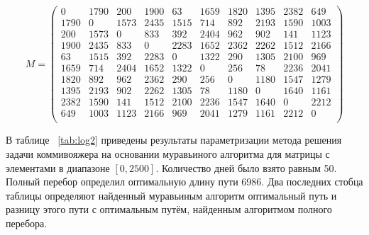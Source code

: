 \begin{equation}
    \label{matrix1}
    M = \begin{pmatrix}
        0 &  1790 &   200 &  1900 &    63 &  1659 &  1820 &  1395 &  2382 &   649 \\
        1790 &     0 &  1573 &  2435 &  1515 &   714 &   892 &  2193 &  1590 &  1003 \\
        200 &  1573 &     0 &   833 &   392 &  2404 &   962 &   902 &   141 &  1123 \\
        1900 &  2435 &   833 &     0 &  2283 &  1652 &  2362 &  2262 &  1512 &  2166 \\
        63 &  1515 &   392 &  2283 &     0 &  1322 &   290 &  1305 &  2100 &   969 \\
        1659 &   714 &  2404 &  1652 &  1322 &     0 &   256 &    78 &  2236 &  2041 \\
        1820 &   892 &   962 &  2362 &   290 &   256 &     0 &  1180 &  1547 &  1279 \\
        1395 &  2193 &   902 &  2262 &  1305 &    78 &  1180 &     0 &  1640 &  1161 \\
        2382 &  1590 &   141 &  1512 &  2100 &  2236 &  1547 &  1640 &     0 &  2212 \\
        649 &  1003 &  1123 &  2166 &   969 &  2041 &  1279 &  1161 &  2212 &     0 \\
    \end{pmatrix}
\end{equation}


В таблице ~\ref{tab:log2} приведены результаты параметризации метода решения задачи коммивояжера на основании муравьиного алгоритма для матрицы с элементами в диапазоне $[0, 2500]$. Количество дней было взято равным 50. Полный перебор определил оптимальную длину пути 6986. Два последних стобца таблицы определяют найденный муравьиным алгоритм оптимальный путь и разницу этого пути с оптимальным путём, найденным алгоритмом полного перебора.

